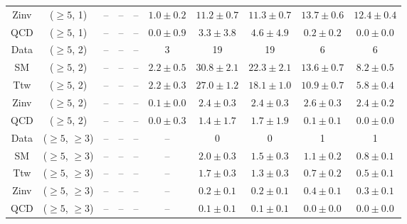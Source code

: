 \begin{table}[h!]
{\begin{tabular}{cccccccccc}
	Zinv & ($\ge5$, 1) & -- & -- & -- & $1.0\pm 0.2$ & $11.2\pm 0.7$ & $11.3\pm 0.7$ & $13.7\pm 0.6$ & $12.4\pm 0.4$ \\[0.5ex] 
	QCD & ($\ge5$, 1) & -- & -- & -- & $0.0\pm 0.9$ & $3.3\pm 3.8$ & $4.6\pm 4.9$ & $0.2\pm 0.2$ & $0.0\pm 0.0$ \\[0.5ex] 
	Data & ($\ge5$, 2) & -- & -- & -- & 3 & 19 & 19 & 6 & 6 \\[0.5ex] 
	SM & ($\ge5$, 2) & -- & -- & -- & $2.2\pm 0.5$ & $30.8\pm 2.1$ & $22.3\pm 2.1$ & $13.6\pm 0.7$ & $8.2\pm 0.5$ \\[0.5ex] 
	Ttw & ($\ge5$, 2) & -- & -- & -- & $2.2\pm 0.3$ & $27.0\pm 1.2$ & $18.1\pm 1.0$ & $10.9\pm 0.7$ & $5.8\pm 0.4$ \\[0.5ex] 
	Zinv & ($\ge5$, 2) & -- & -- & -- & $0.1\pm 0.0$ & $2.4\pm 0.3$ & $2.4\pm 0.3$ & $2.6\pm 0.3$ & $2.4\pm 0.2$ \\[0.5ex] 
	QCD & ($\ge5$, 2) & -- & -- & -- & $0.0\pm 0.3$ & $1.4\pm 1.7$ & $1.7\pm 1.9$ & $0.1\pm 0.1$ & $0.0\pm 0.0$ \\[0.5ex] 
	Data & ($\ge5$, $\ge3$) & -- & -- & -- & -- & 0 & 0 & 1 & 1 \\[0.5ex] 
	SM & ($\ge5$, $\ge3$) & -- & -- & -- & -- & $2.0\pm 0.3$ & $1.5\pm 0.3$ & $1.1\pm 0.2$ & $0.8\pm 0.1$ \\[0.5ex] 
	Ttw & ($\ge5$, $\ge3$) & -- & -- & -- & -- & $1.7\pm 0.3$ & $1.3\pm 0.3$ & $0.7\pm 0.2$ & $0.5\pm 0.1$ \\[0.5ex] 
	Zinv & ($\ge5$, $\ge3$) & -- & -- & -- & -- & $0.2\pm 0.1$ & $0.2\pm 0.1$ & $0.4\pm 0.1$ & $0.3\pm 0.1$ \\[0.5ex] 
	QCD & ($\ge5$, $\ge3$) & -- & -- & -- & -- & $0.1\pm 0.1$ & $0.1\pm 0.1$ & $0.0\pm 0.0$ & $0.0\pm 0.0$ \\[0.5ex] 
	\hline
	\hline
\end{tabular}}
\end{table}
